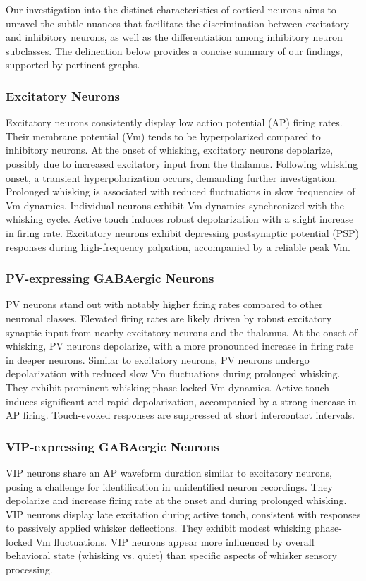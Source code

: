 \documentclass{IEEEtran}
\begin{document}
Our investigation into the distinct characteristics of cortical neurons aims to unravel the subtle nuances that facilitate the discrimination between excitatory and inhibitory neurons, as well as the differentiation among inhibitory neuron subclasses. The delineation below provides a concise summary of our findings, supported by pertinent graphs.

\subsubsection{Excitatory Neurons}
Excitatory neurons consistently display low action potential (AP) firing rates. Their membrane potential (Vm) tends to be hyperpolarized compared to inhibitory neurons. At the onset of whisking, excitatory neurons depolarize, possibly due to increased excitatory input from the thalamus. Following whisking onset, a transient hyperpolarization occurs, demanding further investigation. Prolonged whisking is associated with reduced fluctuations in slow frequencies of Vm dynamics. Individual neurons exhibit Vm dynamics synchronized with the whisking cycle. Active touch induces robust depolarization with a slight increase in firing rate. Excitatory neurons exhibit depressing postsynaptic potential (PSP) responses during high-frequency palpation, accompanied by a reliable peak Vm.

\subsubsection{PV-expressing GABAergic Neurons}
PV neurons stand out with notably higher firing rates compared to other neuronal classes. Elevated firing rates are likely driven by robust excitatory synaptic input from nearby excitatory neurons and the thalamus. At the onset of whisking, PV neurons depolarize, with a more pronounced increase in firing rate in deeper neurons. Similar to excitatory neurons, PV neurons undergo depolarization with reduced slow Vm fluctuations during prolonged whisking. They exhibit prominent whisking phase-locked Vm dynamics. Active touch induces significant and rapid depolarization, accompanied by a strong increase in AP firing. Touch-evoked responses are suppressed at short intercontact intervals.

\subsubsection{VIP-expressing GABAergic Neurons}
VIP neurons share an AP waveform duration similar to excitatory neurons, posing a challenge for identification in unidentified neuron recordings. They depolarize and increase firing rate at the onset and during prolonged whisking. VIP neurons display late excitation during active touch, consistent with responses to passively applied whisker deflections. They exhibit modest whisking phase-locked Vm fluctuations. VIP neurons appear more influenced by overall behavioral state (whisking vs. quiet) than specific aspects of whisker sensory processing.
\end{document}
